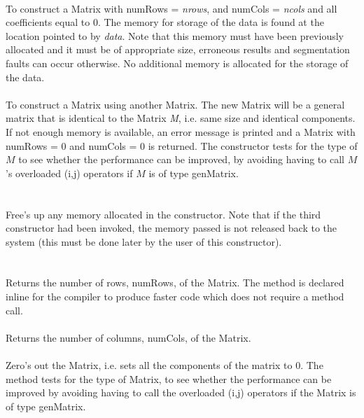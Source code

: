   \\
To construct a Matrix with numRows = {\em nrows}, and numCols =
{\em ncols} and all coefficients equal to $0$. The memory for storage
of the data is found at the location pointed to by {\em data}. Note
that this memory must have been previously allocated and it must be of
appropriate size, erroneous results and segmentation faults can occur
otherwise. No additional memory is allocated for the storage of the
data. \\ 

  \\
To construct a Matrix using another Matrix. The new Matrix will be a
general matrix that is identical to the Matrix {\em M}, i.e. same size
and identical components. If not enough memory is available, an error
message is printed and a Matrix with numRows = $0$ and numCols = $0$
is returned. The constructor tests for the type of $M$ to see whether
the performance can be improved, by avoiding having to call $M$'s
overloaded (i,j) operators if $M$ is of type genMatrix. \\ 

 \\
 \\ 
Free's up any memory allocated in the constructor. Note that if the
third constructor had been invoked, the memory passed is not released
back to the system (this must be done later by the user of this
constructor). \\

  \\
 \\
Returns the number of rows, numRows, of the Matrix. The method is
declared inline for the compiler to produce faster code which does not
require a method call. \\

 \\
Returns the number of columns, numCols, of the Matrix. \\

 \\
Zero's out the Matrix, i.e. sets all the components of the matrix to
$0$. The method tests for the type of Matrix, to see whether the
performance can be improved by avoiding having to call the overloaded
(i,j) operators if the Matrix is of type genMatrix. \\ 

